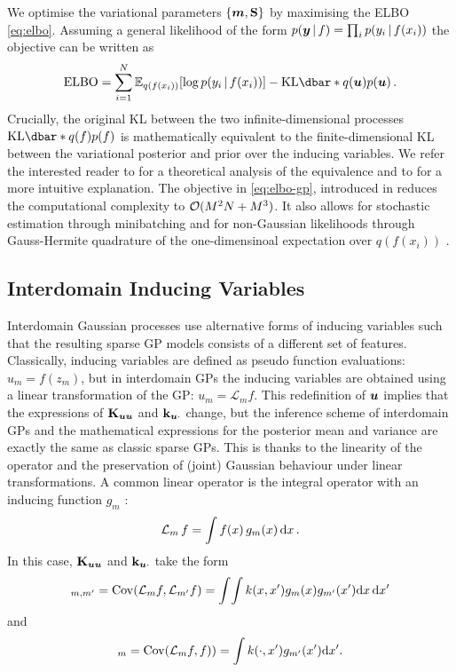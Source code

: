 We optimise the variational parameters $\{\bm{m}, \mathbf{{S}}\}$ by maximising the ELBO \cref{eq:elbo}. Assuming a general likelihood of the form $p(\bm{y} \,|\, f) = \prod_i p(y_i \,|\, f(x_i))$ the objective can be written as
\begin{equation}
  \label{eq:elbo-gp} 
  \textrm{ELBO} = \sum_{i=1}^N \Exp{q(f(x_i))}{\log p(y_i \given f(x_i))} - \KL{q(\vu)}{p(\vu)} \,. 
\end{equation}
Crucially, the original KL between the two infinite-dimensional processes $\KL{q(f)}{p(f)}$ is mathematically equivalent to the finite-dimensional KL between the variational posterior and prior over the inducing variables. We refer the interested reader to \citet{matthews16} for a theoretical analysis of the equivalence and to \citet[Section 4.1]{Leibfried2020Tutorial} for a more intuitive explanation. The objective in \cref{eq:elbo-gp}, introduced in \citet{hensman2013,hensman2015scalable} reduces the computational complexity to $\mathcal{O}(M^2 N + M^3)$. It also allows for stochastic estimation through minibatching \citep{hensman2013} and for non-Gaussian likelihoods through Gauss-Hermite quadrature of the one-dimensinoal expectation over $q(f(x_i))$ \citep{hensman2015scalable}.

\subsection{Interdomain Inducing Variables}
\label{section:interdomain-inducing-variables}

Interdomain Gaussian processes use alternative forms of inducing variables such that the resulting sparse GP models consists of a different set of features. %
Classically, inducing variables are defined as pseudo function evaluations: $u_m = f(z_m)$, but in interdomain GPs the inducing variables are obtained using a linear transformation of the GP: $u_m = \mathcal{L}_m f$. This redefinition of $\bm{u}$ implies that the expressions of $\mathbf{{K}}_{\bm{u} \bm{u}}$ and $\mathbf{k}_{\bm{u} \cdot}$ change, but the inference scheme of interdomain GPs and the mathematical expressions for the posterior mean and variance are exactly the same as classic sparse GPs. This is thanks to the linearity of the operator and the preservation of (joint) Gaussian behaviour under linear transformations. A common linear operator is the integral operator with an inducing function $g_m$ \citep{lazaro2009inter}:
\begin{equation*}
    \mathcal{L}_m\,f = \int f(x)\,g_m(x)\,\mathrm{d}{x}\,.
\end{equation*}
In this case, $\mathbf{{K}}_{\bm{u} \bm{u}}$ and $\mathbf{k}_{\bm{u} \cdot}$ take the form
\begin{equation}
 [\Kuu]_{m,m'}  = \Cov(\mathcal{L}_m f, \mathcal{L}_{m'} f) = \int\!\int k(x, x') g_{m}(x) g_{m'}(x') \calcd{x}\,\calcd{x'}
\end{equation}
and 
\begin{equation}
 [\kux]_{m}  = \Cov(\mathcal{L}_m f, f)) = \int k(\cdot, x') g_{m'}(x') \calcd{x'}.
\end{equation}


